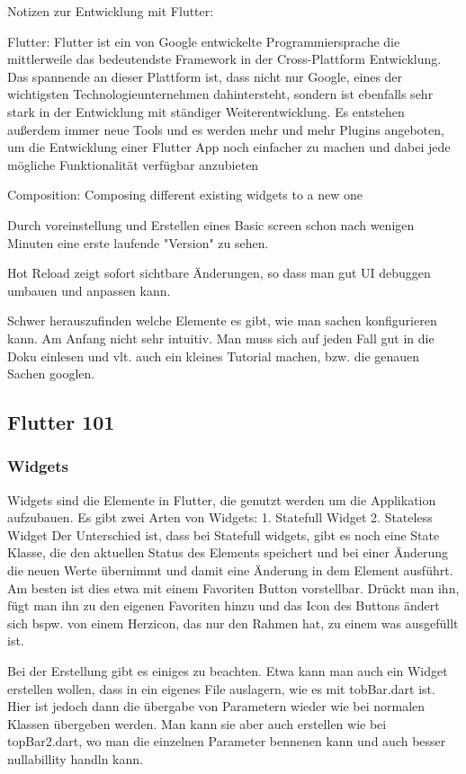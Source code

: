 Notizen zur Entwicklung mit Flutter:

Flutter:
Flutter ist ein von Google entwickelte Programmiersprache die mittlerweile das bedeutendste Framework in der Cross-Plattform Entwicklung. Das spannende an dieser Plattform ist, dass nicht nur Google, eines der wichtigsten Technologieunternehmen dahintersteht, sondern ist ebenfalls sehr stark in der Entwicklung mit ständiger Weiterentwicklung. Es entstehen außerdem immer neue Tools und es werden mehr und mehr Plugins angeboten, um die Entwicklung einer Flutter App noch einfacher zu machen und dabei jede mögliche Funktionalität verfügbar anzubieten

Composition: Composing different existing widgets to a new one

Durch voreinstellung und Erstellen eines Basic screen schon nach wenigen Minuten eine erste laufende "Version" zu sehen.

Hot Reload zeigt sofort sichtbare Änderungen, so dass man gut UI debuggen umbauen und anpassen kann.

Schwer herauszufinden welche Elemente es gibt, wie man sachen konfigurieren kann. Am Anfang nicht sehr intuitiv. Man muss sich auf jeden Fall gut in die Doku einlesen und vlt. auch ein kleines Tutorial machen, bzw. die genauen Sachen googlen.



\subsection{Flutter 101}
\subsubsection{Widgets}
Widgets sind die Elemente in Flutter, die genutzt werden um die Applikation aufzubauen.
Es gibt zwei Arten von Widgets:
1. Statefull Widget
2. Stateless Widget
Der Unterschied ist, dass bei Statefull widgets, gibt es noch eine State Klasse, die den aktuellen Status des Elements speichert und bei einer Änderung die neuen Werte übernimmt und damit eine Änderung in dem Element ausführt. Am besten ist dies etwa mit einem Favoriten Button vorstellbar. Drückt man ihn, fügt man ihn zu den eigenen Favoriten hinzu und das Icon des Buttons ändert sich bspw. von einem Herzicon, das nur den Rahmen hat, zu einem was ausgefüllt ist.

Bei der Erstellung gibt es einiges zu beachten. 
Etwa kann man auch ein Widget erstellen wollen, dass in ein eigenes File auslagern, wie es mit tobBar.dart ist. Hier ist jedoch dann die übergabe von Parametern wieder wie bei normalen Klassen übergeben werden. Man kann sie aber auch erstellen wie bei topBar2.dart, wo man die einzelnen Parameter bennenen kann und auch besser nullabillity handln kann.

